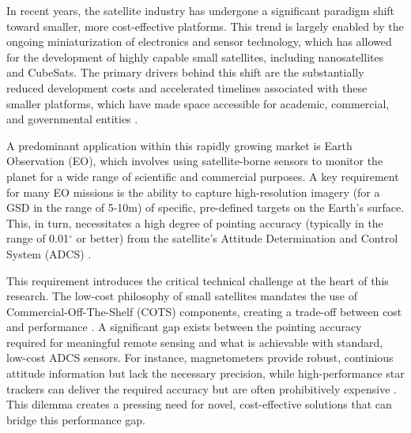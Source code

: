 \label{chap:introduction}

\label{sec:overview}

\noindent
In recent years, the satellite industry has undergone a significant paradigm shift toward smaller, more cost-effective platforms. This trend is largely enabled by 
the ongoing miniaturization of electronics and sensor technology, which has allowed for the development of highly capable small satellites, including nanosatellites and 
CubeSats. The primary drivers behind this shift are the substantially reduced development costs and accelerated timelines associated with these smaller platforms, which 
have made space accessible for academic, commercial, and governmental entities \cite{Villela,bouwmeester2010}.
\vspace{0.5cm}

\noindent
A predominant application within this rapidly growing market is Earth Observation (EO), which involves using satellite-borne sensors to monitor the planet for a 
wide range of scientific and commercial purposes. A key requirement for many EO missions is the ability to capture high-resolution imagery (for a GSD in the range of 5-10m) of specific, pre-defined targets 
on the Earth's surface. This, in turn, necessitates a high degree of pointing accuracy (typically in the range of 0.01$^\circ$ or better) from the satellite's Attitude Determination 
and Control System (ADCS) \cite{Toth2016, Lesikar, Zhang2024}.
\vspace{0.5cm}

\noindent
This requirement introduces the critical technical challenge at the heart of this research. The low-cost philosophy of small satellites mandates the use of 
Commercial-Off-The-Shelf (COTS) components, creating a trade-off between cost and performance \cite{Villela,bouwmeester2010}. A significant gap exists between the pointing accuracy required for meaningful 
remote sensing and what is achievable with standard, low-cost ADCS sensors. For instance, magnetometers provide robust, continious attitude information but lack the necessary 
precision, while high-performance star trackers can deliver the required accuracy but are often prohibitively expensive \cite{Ibrahim2020}. This dilemma creates a pressing need for novel, 
cost-effective solutions that can bridge this performance gap.

